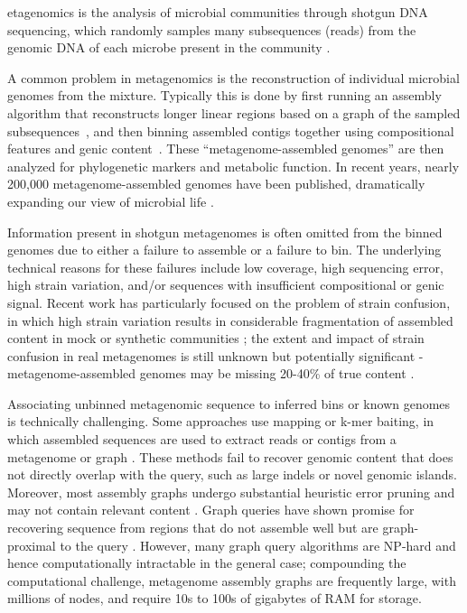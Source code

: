 etagenomics is the analysis of microbial communities through shotgun
DNA sequencing, which randomly samples many subsequences (reads)
from the genomic DNA of each microbe present in the community \cite{Quince2017}.

A common problem in metagenomics is the reconstruction of
individual microbial genomes from the mixture.
Typically this is
done by first running an assembly algorithm that reconstructs
longer linear regions based on a graph of the sampled
subsequences~\cite{pell2012scaling}, and then binning assembled
contigs together using compositional features and genic content~\cite{laczny2017busybee,lin2016accurate}.  These
``metagenome-assembled genomes'' are then
analyzed for phylogenetic markers and metabolic function. In recent years,
nearly 200,000 metagenome-assembled genomes have been published,
dramatically expanding our view of microbial life
\cite{Parks2017,Tully2018,Stewart2018,Delmont2018,Hug2016,Pasolli2019}.

Information present in shotgun metagenomes is often omitted from the
binned genomes due to either a failure to
assemble \cite{CAMI,Awad155358} or a failure to bin.  The underlying
technical reasons for these failures include low coverage, high
sequencing error, high strain variation, and/or sequences with
insufficient compositional or genic signal.  Recent work has
particularly focused on the problem of strain confusion, in which high
strain variation results in considerable fragmentation of assembled
content in mock or synthetic communities \cite{CAMI,Awad155358}; the
extent and impact of strain confusion in real metagenomes is still
unknown but potentially significant - metagenome-assembled genomes may be missing 20-40\% of true content \cite{brownstrain,Brito2016,baltic}.

Associating unbinned metagenomic sequence to inferred bins or known
genomes is technically challenging.  Some approaches use mapping or
k-mer baiting, in which assembled sequences are used to extract reads
or contigs from a metagenome or
graph \cite{desman,Nayfach2016,ekg,mspminer,Petersen2016}.
These
methods fail to recover genomic content that does not directly overlap
with the query, such as large indels or novel genomic
islands. Moreover, most assembly graphs undergo substantial heuristic
error pruning and may not contain relevant content
\cite{CAMI,Awad155358}.
Graph queries have shown promise for recovering sequence from regions that do
not assemble well but are graph-proximal to the query \cite{metacherchant,perchlorate}. However, many graph query
algorithms are NP-hard and hence computationally intractable in the
general case; compounding the computational challenge, metagenome assembly
graphs are frequently large, with millions of nodes, and require 10s
to 100s of gigabytes of RAM for storage.

